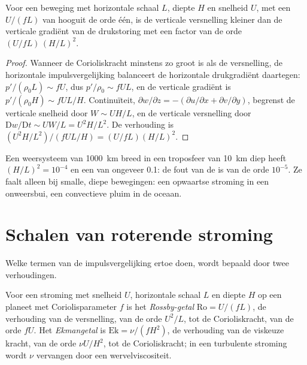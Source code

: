 \begin{proposition}\label{prop:b3:gfd-foundations:hydrostatic}
Voor een beweging met horizontale schaal $L$, diepte $H$ en snelheid $U$, met een
 $U/(fL)$ van hooguit de orde één, is de verticale versnelling
kleiner dan de verticale gradiënt van de drukstoring met een factor
van de orde $(U/fL)\,(H/L)^2$.
\end{proposition}

\begin{proof}
Wanneer de Corioliskracht minstens zo groot is als de versnelling, de
horizontale impulsvergelijking balanceert de horizontale drukgradiënt
daartegen: $p'/(\rho_0 L) \sim fU$, dus $p'/\rho_0 \sim fUL$, en de verticale
gradiënt is $p'/(\rho_0 H) \sim fUL/H$. Continuïteit, $\partial w/\partial z
= -(\partial u/\partial x + \partial v/\partial y)$, begrenst de verticale
snelheid door $W \sim UH/L$, en de verticale versnelling door
$\mathrm Dw/\mathrm Dt \sim UW/L = U^2H/L^2$. De verhouding is $(U^2H/L^2)/(fUL/H)
= (U/fL)(H/L)^2$.
\end{proof}

Een weersysteem van \qty{1000}{km} breed in een troposfeer van \qty{10}{km} diep heeft
$(H/L)^2 = 10^{-4}$ en een  van ongeveer 0.1: de fout van de
 is van de orde $10^{-5}$. Ze faalt alleen bij smalle, diepe bewegingen: een
opwaartse stroming in een onweersbui, een convectieve pluim in de oceaan.

\section{Schalen van roterende stroming}\label{sec:b3:gfd-foundations:scales}

Welke termen van de impulsvergelijking ertoe doen, wordt bepaald door twee verhoudingen.

\begin{definition}\label{def:b3:gfd-foundations:numbers}
Voor een stroming met snelheid $U$, horizontale schaal $L$ en diepte $H$ op een planeet met
Coriolisparameter $f$ is het \emph{Rossby-getal}
$\mathrm{Ro} = U/(fL)$, de verhouding van de versnelling, van de orde $U^2/L$,
tot de Corioliskracht, van de orde $fU$. Het
\emph{Ekmangetal} is $\mathrm{Ek} = \nu/(fH^2)$, de verhouding van de
viskeuze kracht, van de orde $\nu U/H^2$, tot de Corioliskracht; in een
turbulente stroming wordt $\nu$ vervangen door een wervelviscositeit.
\end{definition}

